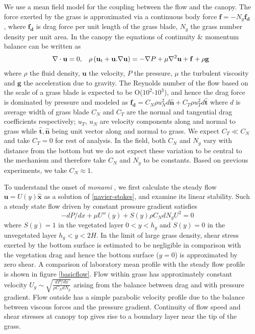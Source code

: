 \documentclass[aps,prl,twocolumn,superscriptaddress,10pt]{revtex4-1}  %
\newcommand{\bn}{{\boldsymbol{\hat{n}}}}
\newcommand{\bt}{{\boldsymbol{\hat{t}}}}
\newcommand{\bu}{\mathbf{u}}
\newcommand{\grad}{\mathbf{\nabla}}
\newcommand{\hg}{h_g}
\newcommand{\monami}{\textit{monami }}
\newcommand{\shreyas}[1]{}
\begin{document}
We use a mean field model for the coupling between the flow and the canopy. 
The force exerted by the grass is approximated via a continuous body force $\mathbf{f}=-N_g\mathbf{f_d}$,  
where $\mathbf{f_{d}}$ is drag force per unit length of the grass blade, $N_g$ the grass number density per unit area. In the canopy the equations of continuity \& momentum balance can be written as 
\begin{equation}
\quad \grad\cdot\bu = 0,\hspace{3mm} \rho \left(\bu_{t}+\bu.\grad\bu \right) = -\grad P+\mu\grad^{2}\bu +\mathbf{f}+\rho\mathbf{g}
\label{navier-stokes}
\end{equation}
where $\rho$ the fluid density, $\mathbf{u}$ the velocity, 
$P$ the pressure, $\mu$ the turbulent viscosity and $\mathbf{g}$ the acceleration due to gravity. 
The Reynolds number of the flow based on the scale of a grass blade is expected to be O($10^2$-$10^3$), and hence the drag force is dominated by pressure and modeled as 
$\mathbf{f_{d}}=C_N \rho u_{N}^{2}d\bn + C_{T}\rho u_{T}^{2}d\bt$ \shreyas{citation needed} 
where $d$ is average width of grass blade $C_{N}$ and $C_{T}$ are the normal and tangential drag coefficients respectively; $u_{T}$, $u_{N}$ are velocity components along and
normal to grass while $\bt,\bn$ being unit vector along and normal to grass. 
We expect $C_T \ll C_N$ and take $C_T=0$ for rest of analysis. 
In the field, both $C_N$ and $N_g$ vary with distance from the bottom but we do not expect these variation to be central to the mechanism and therefore take $C_N$ and $N_g$ to be constants. 
Based on previous experiments\cite{Vivoni98}, we take $C_N \approx 1$.

To understand the onset of \monami, we first calculate the steady flow $\bu = U(y)\boldsymbol{\hat{x}}$ as a solution of \eqref{navier-stokes}, and examine its linear stability. 
Such a steady state flow driven by constant pressure gradient satisfies 
\begin{equation}
 -{dP}/{dx}+\mu U''(y) +S(y) \rho C_N d N_gU^2=0
\label{base_equ}
\end{equation}
where $S(y)=1$ in the vegetated layer $0<y<\hg$ and $S(y)=0$ in the unvegetated layer $\hg< y< 2H$. 
In the limit of large grass density, shear stress exerted by the bottom surface is estimated to be negligible in comparison with the vegetation drag and hence the bottom surface ($y=0$) is approximated by zero shear.   
A comparison of laboratory mean profile with the steady flow profile is shown in figure \eqref{basicflow}.
Flow within grass has approximately constant velocity $U_g \sim \sqrt{\frac{dP/dx}{\rho C_N dN_g}}$ arising from the balance between drag and with pressure gradient. 
Flow outside has a simple parabolic velocity profile due to the balance between viscous forces and the pressure gradient. 
Continuity of flow speed and shear stresses at canopy top gives rise to a boundary layer near the tip of the grass. 
\end{document}
